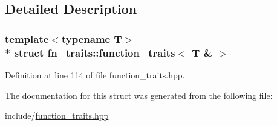 \subsection{Detailed Description}
\subsubsection*{template$<$typename T$>$\\*
struct fn\+\_\+traits\+::function\+\_\+traits$<$ T \& $>$}



Definition at line 114 of file function\+\_\+traits.\+hpp.



The documentation for this struct was generated from the following file\+:\begin{DoxyCompactItemize}
\item 
include/\hyperlink{function__traits_8hpp}{function\+\_\+traits.\+hpp}\end{DoxyCompactItemize}
